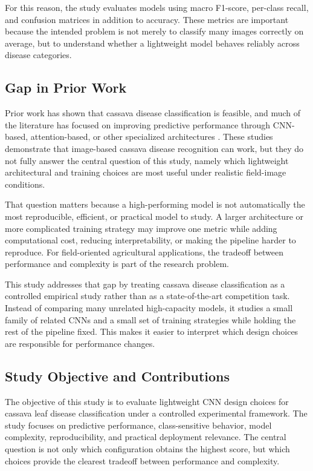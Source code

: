 \documentclass[11pt]{article}
\begin{document}
For this reason, the study evaluates models using macro F1-score, per-class recall, and confusion matrices in addition to accuracy. These metrics are important because the intended problem is not merely to classify many images correctly on average, but to understand whether a lightweight model behaves reliably across disease categories.

\subsection{Gap in Prior Work}

Prior work has shown that cassava disease classification is feasible, and much of the literature has focused on improving predictive performance through CNN-based, attention-based, or other specialized architectures \cite{ramcharan2017,mwebaze2019,sambasivam2021}. These studies demonstrate that image-based cassava disease recognition can work, but they do not fully answer the central question of this study, namely which lightweight architectural and training choices are most useful under realistic field-image conditions.

That question matters because a high-performing model is not automatically the most reproducible, efficient, or practical model to study. A larger architecture or more complicated training strategy may improve one metric while adding computational cost, reducing interpretability, or making the pipeline harder to reproduce. For field-oriented agricultural applications, the tradeoff between performance and complexity is part of the research problem.

This study addresses that gap by treating cassava disease classification as a controlled empirical study rather than as a state-of-the-art competition task. Instead of comparing many unrelated high-capacity models, it studies a small family of related CNNs and a small set of training strategies while holding the rest of the pipeline fixed. This makes it easier to interpret which design choices are responsible for performance changes.

\subsection{Study Objective and Contributions}

The objective of this study is to evaluate lightweight CNN design choices for cassava leaf disease classification under a controlled experimental framework. The study focuses on predictive performance, class-sensitive behavior, model complexity, reproducibility, and practical deployment relevance. The central question is not only which configuration obtains the highest score, but which choices provide the clearest tradeoff between performance and complexity.
\end{document}
